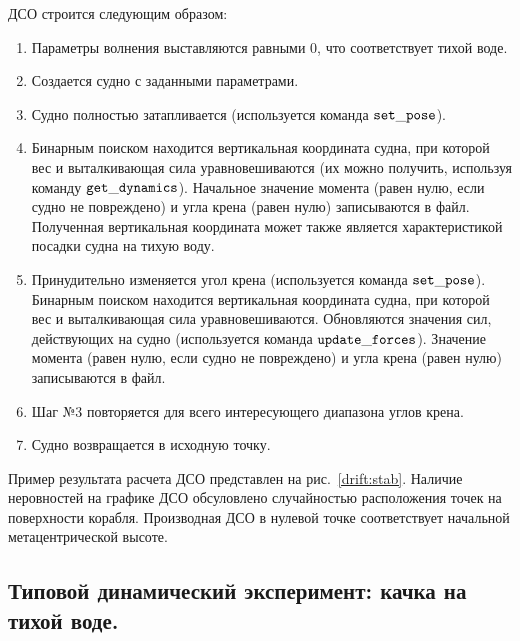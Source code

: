 ДСО строится следующим образом:
\begin{enumerate}
	\item	Параметры волнения выставляются равными 0, что соответствует тихой воде.
	\item	Создается судно с заданными параметрами.
	\item	Судно полностью затапливается (используется команда $\tt set\_pose$).
	\item	Бинарным поиском находится вертикальная координата судна, 
			при которой вес и выталкивающая сила уравновешиваются 
			(их можно получить, используя команду 
			$\tt get\_dynamics$). 
			Начальное значение момента (равен нулю, если судно не повреждено) 
			и угла крена (равен нулю)
			записываются в файл. Полученная вертикальная координата может также 
			является характеристикой посадки судна на тихую воду.
	\item	Принудительно изменяется угол крена (используется команда $\tt set\_pose$). 
			Бинарным поиском находится вертикальная координата судна, 
			при которой вес и выталкивающая сила уравновешиваются. 
			Обновляются значения сил, действующих на судно 
			(используется команда $\tt update\_forces$).
			Значение момента (равен нулю, если судно не повреждено) и угла крена (равен нулю)
			записываются в файл.
	\item	Шаг №3 повторяется для всего интересующего диапазона углов крена.
	\item	Судно возвращается в исходную точку.
\end{enumerate}

Пример результата расчета ДСО представлен на рис.~\ref{drift:stab}. Наличие неровностей на графике ДСО обсуловлено случайностью расположения точек на поверхности корабля. Производная ДСО в нулевой точке соответствует начальной метацентрической высоте.



\subsection{Типовой динамический эксперимент: качка на тихой воде.}

